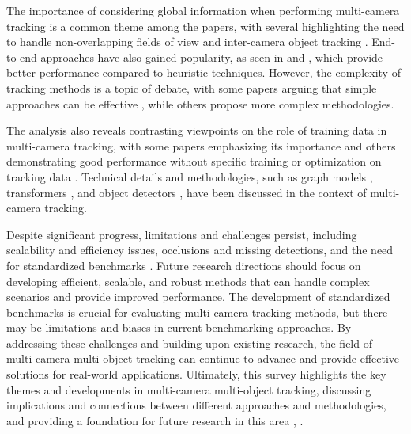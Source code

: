 \documentclass[conference]{IEEEtran}
\begin{document}
The importance of considering global information when performing multi-camera tracking is a common theme among the papers, with several highlighting the need to handle non-overlapping fields of view and inter-camera object tracking \cite{An equalised global graphical model-based approach}. End-to-end approaches have also gained popularity, as seen in \cite{MCTR: Multi Camera Tracking Transformer} and \cite{Tracktor}, which provide better performance compared to heuristic techniques. However, the complexity of tracking methods is a topic of debate, with some papers arguing that simple approaches can be effective \cite{Tracking without bells and whistles}, while others propose more complex methodologies.

The analysis also reveals contrasting viewpoints on the role of training data in multi-camera tracking, with some papers emphasizing its importance \cite{MCTR: Multi Camera Tracking Transformer} and others demonstrating good performance without specific training or optimization on tracking data \cite{Tracktor}. Technical details and methodologies, such as graph models \cite{An equalised global graphical model-based approach}, transformers \cite{MCTR: Multi Camera Tracking Transformer}, and object detectors \cite{Tracktor}, have been discussed in the context of multi-camera tracking.

Despite significant progress, limitations and challenges persist, including scalability and efficiency issues, occlusions and missing detections, and the need for standardized benchmarks \cite{Tracking the Trackers}. Future research directions should focus on developing efficient, scalable, and robust methods that can handle complex scenarios and provide improved performance. The development of standardized benchmarks is crucial for evaluating multi-camera tracking methods, but there may be limitations and biases in current benchmarking approaches. By addressing these challenges and building upon existing research, the field of multi-camera multi-object tracking can continue to advance and provide effective solutions for real-world applications. Ultimately, this survey highlights the key themes and developments in multi-camera multi-object tracking, discussing implications and connections between different approaches and methodologies, and providing a foundation for future research in this area \cite{MCTR: Multi Camera Tracking Transformer}, \cite{Tracktor}.
\end{document}
